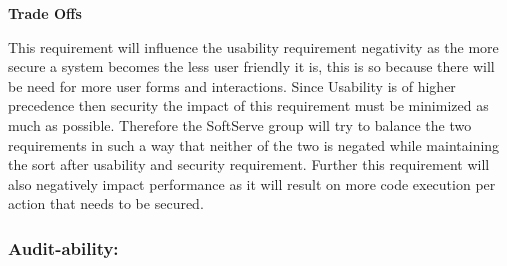 \begin{flushleft}
%

\textbf{Trade Offs}

This requirement will influence the usability requirement negativity as the more secure a system becomes the less user friendly it is, this is so because there will be need for more user forms and interactions. Since Usability is of higher precedence then security the impact of this requirement must be minimized as much as possible. Therefore the SoftServe group will try to balance the two requirements in such a way that neither of the two is negated while maintaining the sort after usability and security requirement. Further this requirement will also negatively impact performance as it will result on more code execution per action that needs to be secured.
\end{flushleft}

\vspace{0.1in}

\subsubsection{Audit-ability:}


